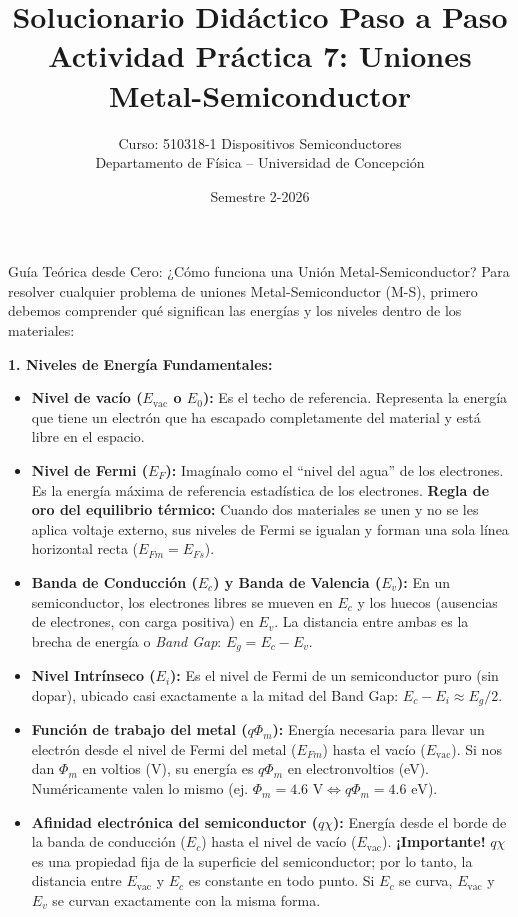 \documentclass[11pt,a4paper]{article}
\title{\textbf{Solucionario Didáctico Paso a Paso\\Actividad Práctica 7: Uniones Metal-Semiconductor}}
\author{Curso: 510318-1 Dispositivos Semiconductores \\ Departamento de Física -- Universidad de Concepción}
\date{Semestre 2-2026}
\begin{document}
\maketitle

\begin{teoriabox}{Guía Teórica desde Cero: ¿Cómo funciona una Unión Metal-Semiconductor?}
Para resolver cualquier problema de uniones Metal-Semiconductor (M-S), primero debemos comprender qué significan las energías y los niveles dentro de los materiales:

\textbf{1. Niveles de Energía Fundamentales:}
\begin{itemize}
    \item \textbf{Nivel de vacío ($E_{\text{vac}}$ o $E_0$):} Es el techo de referencia. Representa la energía que tiene un electrón que ha escapado completamente del material y está libre en el espacio.
    \item \textbf{Nivel de Fermi ($E_F$):} Imagínalo como el ``nivel del agua'' de los electrones. Es la energía máxima de referencia estadística de los electrones. \textbf{Regla de oro del equilibrio térmico:} Cuando dos materiales se unen y no se les aplica voltaje externo, sus niveles de Fermi se igualan y forman una sola línea horizontal recta ($E_{Fm} = E_{Fs}$).
    \item \textbf{Banda de Conducción ($E_c$) y Banda de Valencia ($E_v$):} En un semiconductor, los electrones libres se mueven en $E_c$ y los huecos (ausencias de electrones, con carga positiva) en $E_v$. La distancia entre ambas es la brecha de energía o \textit{Band Gap}: $E_g = E_c - E_v$.
    \item \textbf{Nivel Intrínseco ($E_i$):} Es el nivel de Fermi de un semiconductor puro (sin dopar), ubicado casi exactamente a la mitad del Band Gap: $E_c - E_i \approx E_g/2$.
    \item \textbf{Función de trabajo del metal ($q\Phi_m$):} Energía necesaria para llevar un electrón desde el nivel de Fermi del metal ($E_{Fm}$) hasta el vacío ($E_{\text{vac}}$). Si nos dan $\Phi_m$ en voltios (V), su energía es $q\Phi_m$ en electronvoltios (eV). Numéricamente valen lo mismo (ej. $\Phi_m = 4.6\text{ V} \Leftrightarrow q\Phi_m = 4.6\text{ eV}$).
    \item \textbf{Afinidad electrónica del semiconductor ($q\chi$):} Energía desde el borde de la banda de conducción ($E_c$) hasta el nivel de vacío ($E_{\text{vac}}$). \textbf{¡Importante!} $q\chi$ es una propiedad fija de la superficie del semiconductor; por lo tanto, la distancia entre $E_{\text{vac}}$ y $E_c$ es constante en todo punto. Si $E_c$ se curva, $E_{\text{vac}}$ y $E_v$ se curvan exactamente con la misma forma.
\end{itemize}


\end{teoriabox}
\end{document}

